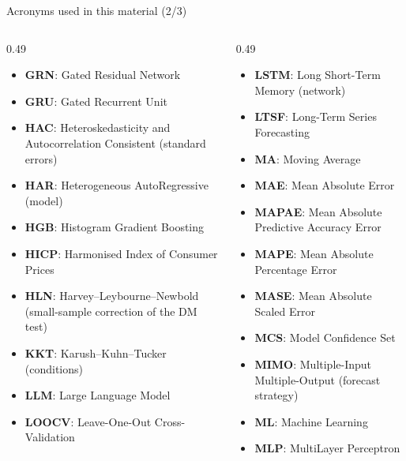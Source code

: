 \begin{frame}{Acronyms used in this material (2/3)}
\begin{columns}[T]
\begin{column}{0.49\textwidth}
\begin{itemize}\setlength{\itemsep}{0pt}
    \item \textbf{GRN}: Gated Residual Network
    \item \textbf{GRU}: Gated Recurrent Unit
    \item \textbf{HAC}: Heteroskedasticity and Autocorrelation Consistent (standard errors)
    \item \textbf{HAR}: Heterogeneous AutoRegressive (model)
    \item \textbf{HGB}: Histogram Gradient Boosting
    \item \textbf{HICP}: Harmonised Index of Consumer Prices
    \item \textbf{HLN}: Harvey–Leybourne–Newbold (small-sample correction of the DM test)
    \item \textbf{KKT}: Karush–Kuhn–Tucker (conditions)
    \item \textbf{LLM}: Large Language Model
    \item \textbf{LOOCV}: Leave-One-Out Cross-Validation
\end{itemize}
\end{column}
\begin{column}{0.49\textwidth}
\begin{itemize}\setlength{\itemsep}{0pt}
    \item \textbf{LSTM}: Long Short-Term Memory (network)
    \item \textbf{LTSF}: Long-Term Series Forecasting
    \item \textbf{MA}: Moving Average
    \item \textbf{MAE}: Mean Absolute Error
    \item \textbf{MAPAE}: Mean Absolute Predictive Accuracy Error
    \item \textbf{MAPE}: Mean Absolute Percentage Error
    \item \textbf{MASE}: Mean Absolute Scaled Error
    \item \textbf{MCS}: Model Confidence Set
    \item \textbf{MIMO}: Multiple-Input Multiple-Output (forecast strategy)
    \item \textbf{ML}: Machine Learning
    \item \textbf{MLP}: MultiLayer Perceptron
\end{itemize}
\end{column}
\end{columns}
\end{frame}
